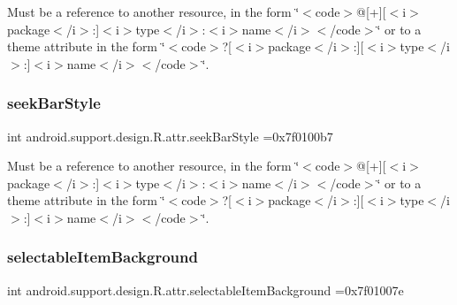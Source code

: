 Must be a reference to another resource, in the form \char`\"{}$<$code$>$@\mbox{[}+\mbox{]}\mbox{[}$<$i$>$package$<$/i$>$\+:\mbox{]}$<$i$>$type$<$/i$>$\+:$<$i$>$name$<$/i$>$$<$/code$>$\char`\"{} or to a theme attribute in the form \char`\"{}$<$code$>$?\mbox{[}$<$i$>$package$<$/i$>$\+:\mbox{]}\mbox{[}$<$i$>$type$<$/i$>$\+:\mbox{]}$<$i$>$name$<$/i$>$$<$/code$>$\char`\"{}. \mbox{\label{classandroid_1_1support_1_1design_1_1R_1_1attr_a1111429614a393a0cb64b39d2410a472}} 
\subsubsection{\texorpdfstring{seek\+Bar\+Style}{seekBarStyle}}
{\footnotesize\ttfamily int android.\+support.\+design.\+R.\+attr.\+seek\+Bar\+Style =0x7f0100b7\hspace{0.3cm}{\ttfamily [static]}}

Must be a reference to another resource, in the form \char`\"{}$<$code$>$@\mbox{[}+\mbox{]}\mbox{[}$<$i$>$package$<$/i$>$\+:\mbox{]}$<$i$>$type$<$/i$>$\+:$<$i$>$name$<$/i$>$$<$/code$>$\char`\"{} or to a theme attribute in the form \char`\"{}$<$code$>$?\mbox{[}$<$i$>$package$<$/i$>$\+:\mbox{]}\mbox{[}$<$i$>$type$<$/i$>$\+:\mbox{]}$<$i$>$name$<$/i$>$$<$/code$>$\char`\"{}. \mbox{\label{classandroid_1_1support_1_1design_1_1R_1_1attr_aa055c8d97d831aa8514926ba6216696f}} 
\subsubsection{\texorpdfstring{selectable\+Item\+Background}{selectableItemBackground}}
{\footnotesize\ttfamily int android.\+support.\+design.\+R.\+attr.\+selectable\+Item\+Background =0x7f01007e\hspace{0.3cm}{\ttfamily [static]}}


